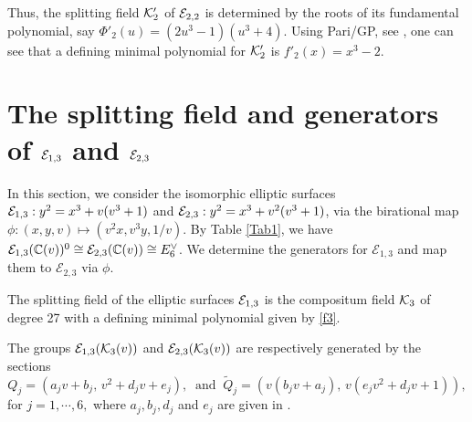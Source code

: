 \documentclass[11pt]{amsart}
\begin{document}
	Thus, the splitting field ${\mathcal K}'_2$  of ${\mathcal E}_{2,2}$ is determined by the roots of its fundamental polynomial, say $\Phi'_{2}(u)= (2 u^3-1)(u^3+4)$. Using Pari/GP, see \cite[GP360]{Shioda360-Codes}, one can see that a defining minimal polynomial for  ${\mathcal K}'_2$ is $f'_2(x)= x^3-2$.


\section{The splitting field and generators of ${\mathcal E}_{1, 3}$  and ${\mathcal E}_{2, 3}$}
\label{E6-(1,3)-(2,3)}
In this section, we  consider the isomorphic  elliptic surfaces   ${\mathcal E}_{1, 3}: y^2=x^3+v (v^3+1)$
and  ${\mathcal E}_{2, 3}: y^2=x^3+   v^2 (v^3+1)$, via the birational map 
$\phi: (x,y,v) \mapsto (v^2 x, v^3 y, 1/v)$.
 By Table \ref{Tab1}, we have   ${\mathcal E}_{1,3}({\mathbb C}(v))^0\cong {\mathcal E}_{2,3}({\mathbb C}(v))\cong E_6^\vee$.
 We determine the generators for $\mathcal{E}_{1,3}$ and map them to $\mathcal{E}_{2,3}$ via $\phi$.


\begin{thm}
	\label{main4}
	The splitting field of the elliptic  surfaces  ${\mathcal E}_{1, 3}$ is the compositum  field ${\mathcal K}_3$ of 
	 degree 27 with a defining minimal polynomial given by \ref{f3}.

	The  groups ${\mathcal E}_{1, 3}({\mathcal K}_3(v))$ and ${\mathcal E}_{2,3}({\mathcal K}_3(v))$ are  respectively generated by the sections
	$$Q_j=\left(  a_j v +b_j, \, v^2 + d_j v +e_j\right),\
	\text{	and } \
	\widetilde{Q}_j=\left( v (b_j v + a_j), \, v (e_j v^2 + d_j v +1) \right),$$
	for $j=1,\cdots, 6,$ 	where 
	$a_j, b_j,  d_j$  and $e_j$ are given  in \cite[Points-3]{Shioda360-Codes}.
\end{thm}
\end{document}
